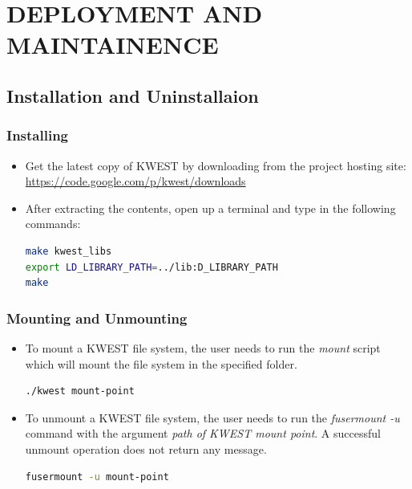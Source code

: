 \chapter{DEPLOYMENT AND MAINTAINENCE}

\section{Installation and Uninstallaion}
\subsection{Installing}
\begin{itemize}
\item Get the latest copy of KWEST by downloading from the project hosting site: \url{https://code.google.com/p/kwest/downloads}
\item After extracting the contents, open up a terminal and type in the following commands:
\begin{lstlisting}[language=bash,frame=single]
make kwest_libs
export LD_LIBRARY_PATH=../lib:D_LIBRARY_PATH
make
\end{lstlisting}
\end{itemize}

\subsection{Mounting and Unmounting}
\begin{itemize}
\item To mount a KWEST file system, the user needs to run the \textit{mount} script which will mount the file system in the specified folder. 
\begin{lstlisting}[language=bash,frame=single]
./kwest mount-point
\end{lstlisting}
\item To unmount a KWEST file system, the user needs to run the \textit{fusermount -u} command with the argument \textit{path of KWEST mount point}. A successful unmount operation does not return any message.
\begin{lstlisting}[language=bash,frame=single]
fusermount -u mount-point
\end{lstlisting}
\end{itemize}


